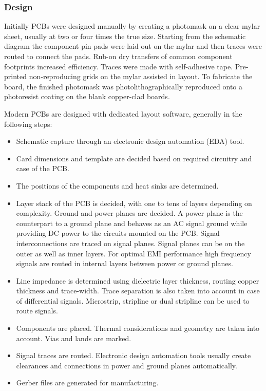 \documentclass[12pt]{article}
\begin{document}
\subsubsection{Design}
Initially PCBs were designed manually by creating a photomask on a clear mylar sheet, usually at two or four times the true size. Starting from the schematic diagram the component pin pads were laid out on the mylar and then traces were routed to connect the pads. Rub-on dry transfers of common component footprints increased efficiency. Traces were made with self-adhesive tape. Pre-printed non-reproducing grids on the mylar assisted in layout. To fabricate the board, the finished photomask was photolithographically reproduced onto a photoresist coating on the blank copper-clad boards.\par 
 Modern PCBs are designed with dedicated layout software, generally in the following steps:
\begin{itemize}
\item Schematic capture through an electronic design automation (EDA) tool.
\item Card dimensions and template are decided based on required circuitry and case of the PCB.
\item The positions of the components and heat sinks are determined.
\item Layer stack of the PCB is decided, with one to tens of layers depending on complexity. Ground and power planes are decided. A power plane is the counterpart to a ground plane and behaves as an AC signal ground while providing DC power to the circuits mounted on the PCB. Signal interconnections are traced on signal planes. Signal planes can be on the outer as well as inner layers. For optimal EMI performance high frequency signals are routed in internal layers between power or ground planes.
\item Line impedance is determined using dielectric layer thickness, routing copper thickness and trace-width. Trace separation is also taken into account in case of differential signals. Microstrip, stripline or dual stripline can be used to route signals.
\item Components are placed. Thermal considerations and geometry are taken into account. Vias and lands are marked.
\item Signal traces are routed. Electronic design automation tools usually create clearances and connections in power and ground planes automatically.
\item Gerber files are generated for manufacturing.
\end{itemize}
\end{document}
